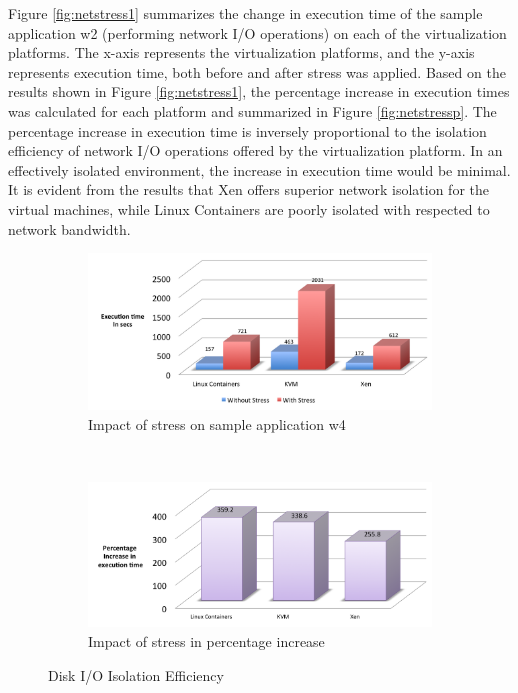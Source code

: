 Figure \ref{fig:netstress1} summarizes the change in execution time of the sample application w2 (performing network I/O operations) on each of the virtualization platforms. The x-axis represents the virtualization platforms, and the y-axis represents execution time, both before and after stress was applied. Based on the results shown in Figure \ref{fig:netstress1}, the percentage increase in execution times was calculated for each platform and summarized in Figure \ref{fig:netstressp}. The percentage increase in execution time is inversely proportional to the isolation efficiency of network I/O operations offered by the virtualization platform. In an effectively isolated environment, the increase in execution time would be minimal. It is evident from the results that Xen offers superior network isolation for the virtual machines, while Linux Containers are poorly isolated with respected to network bandwidth.


\begin{figure}[H]
        \centering
        \begin{subfigure}[b]{0.99\textwidth}
                \includegraphics[width=\textwidth]{diskstress.png}
                \caption{Impact of stress on sample application w4}
                \label{fig:diskstress1}
        \end{subfigure}%
        ~ %
        \qquad \newline %
        \begin{subfigure}[b]{0.8\textwidth}
                \includegraphics[width=\textwidth]{diskstressp.png}
                \caption{Impact of stress in percentage increase}
                \label{fig:diskstressp}
        \end{subfigure}
        \caption{Disk I/O Isolation Efficiency}\label{fig:diskisolation}
\end{figure}

